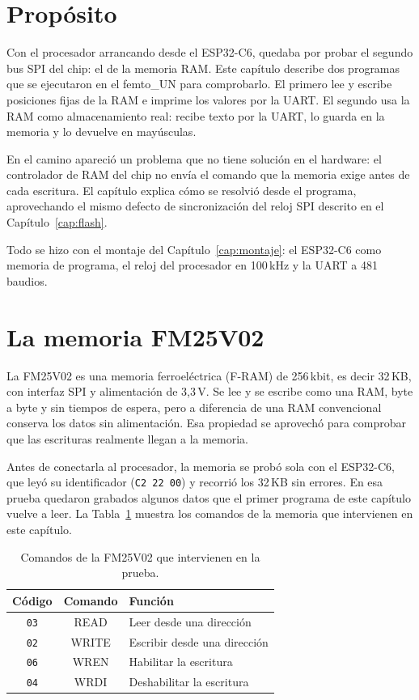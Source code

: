 \documentclass[11pt,letterpaper,oneside]{report}
\newcommand{\code}[1]{\texttt{#1}}
\begin{document}
\section{Propósito}

Con el procesador arrancando desde el ESP32-C6, quedaba por probar el segundo bus SPI del chip: el de la memoria RAM. Este capítulo describe dos programas que se ejecutaron en el femto\_UN para comprobarlo. El primero lee y escribe posiciones fijas de la RAM e imprime los valores por la UART. El segundo usa la RAM como almacenamiento real: recibe texto por la UART, lo guarda en la memoria y lo devuelve en mayúsculas.

En el camino apareció un problema que no tiene solución en el hardware: el controlador de RAM del chip no envía el comando que la memoria exige antes de cada escritura. El capítulo explica cómo se resolvió desde el programa, aprovechando el mismo defecto de sincronización del reloj SPI descrito en el Capítulo~\ref{cap:flash}.

Todo se hizo con el montaje del Capítulo~\ref{cap:montaje}: el ESP32-C6 como memoria de programa, el reloj del procesador en 100\,kHz y la UART a 481 baudios.

\section{La memoria FM25V02}

La FM25V02 es una memoria ferroeléctrica (F-RAM) de 256\,kbit, es decir 32\,KB, con interfaz SPI y alimentación de 3,3\,V. Se lee y se escribe como una RAM, byte a byte y sin tiempos de espera, pero a diferencia de una RAM convencional conserva los datos sin alimentación. Esa propiedad se aprovechó para comprobar que las escrituras realmente llegan a la memoria.

Antes de conectarla al procesador, la memoria se probó sola con el ESP32-C6, que leyó su identificador (\code{C2 22 00}) y recorrió los 32\,KB sin errores. En esa prueba quedaron grabados algunos datos que el primer programa de este capítulo vuelve a leer. La Tabla~\ref{tab:comandos} muestra los comandos de la memoria que intervienen en este capítulo.

\begin{table}[htbp]
\centering
\caption{Comandos de la FM25V02 que intervienen en la prueba.}
\label{tab:comandos}
\begin{tabular}{c c l}
\toprule
\textbf{Código} & \textbf{Comando} & \textbf{Función} \\
\midrule
\code{03} & READ & Leer desde una dirección \\
\code{02} & WRITE & Escribir desde una dirección \\
\code{06} & WREN & Habilitar la escritura \\
\code{04} & WRDI & Deshabilitar la escritura \\
\bottomrule
\end{tabular}
\end{table}
\end{document}
